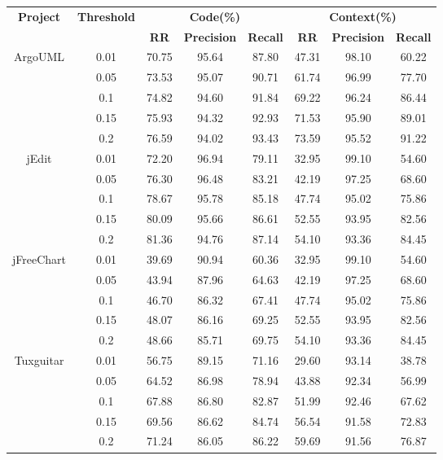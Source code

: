 \begin{table}[htbp]
\vspace{0.5em}\centering\wuhao
\begin{tabular}{cccccccc}
\toprule[1.5pt]
\multirow{2}{*}{\textbf{Project}}&\multirow{2}{*}{\textbf{Threshold}}&\multicolumn{3}{c}{\textbf{ Code(\%)}}&\multicolumn{3}{c}{\textbf{ Context(\%)}}\\
&&\textbf{RR}&\textbf{Precision}&\textbf{Recall}&\textbf{RR}&\textbf{Precision}&\textbf{Recall}\\
\midrule[1pt]
\multirow{5}{*}{ArgoUML}
&0.01&	70.75&	95.64&	87.80&	47.31&	98.10&	60.22\\
&0.05&	73.53&	95.07&	90.71&	61.74&	96.99&	77.70\\
&0.1&	74.82&	94.60&	91.84&	69.22&	96.24&	86.44\\
&0.15&	75.93&	94.32&	92.93&	71.53&	95.90&	89.01\\
&0.2&	76.59&	94.02&	93.43&	73.59&	95.52&	91.22\\

\multirow{5}{*}{jEdit}
&0.01&	72.20&    96.94&	79.11&	32.95&	99.10&	54.60\\
&0.05&	76.30&	96.48&	83.21&	42.19&	97.25&	68.60\\
&0.1&	78.67&	95.78&	85.18&	47.74&	95.02&	75.86\\
&0.15&	80.09&	95.66&	86.61&	52.55&	93.95&	82.56\\
&0.2&	81.36&	94.76&	87.14&	54.10&	93.36&	84.45\\


\multirow{5}{*}{jFreeChart}
&0.01&	39.69&	90.94&	60.36&	32.95&	99.10&	54.60\\
&0.05&	43.94&	87.96&	64.63&	42.19&	97.25&	68.60\\
&0.1&	46.70&	86.32&	67.41&	47.74&	95.02&	75.86\\
&0.15&	48.07&	86.16&	69.25&	52.55&	93.95&	82.56\\
&0.2&	48.66&	85.71&	69.75&	54.10&	93.36&	84.45\\


\multirow{5}{*}{Tuxguitar}
&0.01&	56.75&	89.15&	71.16&	29.60&	93.14&	38.78\\
&0.05&	64.52&	86.98&	78.94&	43.88&	92.34&	56.99\\
&0.1&	67.88&	86.80&	82.87&	51.99&	92.46&	67.62\\
&0.15&	69.56&	86.62&	84.74&	56.54&	91.58&	72.83\\
&0.2&	71.24&	86.05&	86.22&	59.69&	91.56&	76.87\\

\bottomrule[1.5pt]
\end{tabular}
\end{table}

